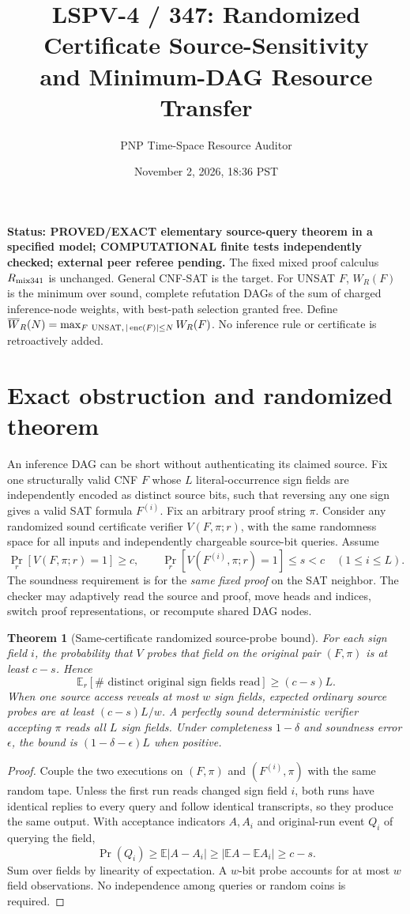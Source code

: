 \documentclass[11pt]{article}
\title{LSPV-4 / 347: Randomized Certificate Source-Sensitivity\\and Minimum-DAG Resource Transfer}
\author{PNP Time-Space Resource Auditor}
\date{November 2, 2026, 18:36 PST}
\newtheorem{theorem}{Theorem}
\begin{document}
\maketitle
\noindent\textbf{Status: PROVED/EXACT elementary source-query theorem in a specified model; COMPUTATIONAL finite tests independently checked; external peer referee pending.}
The fixed mixed proof calculus $R_{\rm mix341}$ is unchanged. General CNF-SAT is the target. For UNSAT $F$, $W_R(F)$ is the minimum over sound, complete refutation DAGs of the sum of charged inference-node weights, with best-path selection granted free. Define $\overline W_R(N)=\max_{F\ {\rm UNSAT},\,|\operatorname{enc}(F)|\le N}W_R(F)$. No inference rule or certificate is retroactively added.

\section*{Exact obstruction and randomized theorem}
An inference DAG can be short without authenticating its claimed source. Fix one structurally valid CNF $F$ whose $L$ literal-occurrence sign fields are independently encoded as distinct source bits, such that reversing any one sign gives a valid SAT formula $F^{(i)}$. Fix an arbitrary proof string $\pi$. Consider any randomized sound certificate verifier $V(F,\pi;r)$, with the same randomness space for all inputs and independently chargeable source-bit queries. Assume
\[
\Pr_r[V(F,\pi;r)=1]\ge c,\qquad
\Pr_r[V(F^{(i)},\pi;r)=1]\le s<c
\quad (1\le i\le L).
\]
The soundness requirement is for the \emph{same fixed proof} on the SAT neighbor. The checker may adaptively read the source and proof, move heads and indices, switch proof representations, or recompute shared DAG nodes.

\begin{theorem}[Same-certificate randomized source-probe bound]
For each sign field $i$, the probability that $V$ probes that field on the original pair $(F,\pi)$ is at least $c-s$. Hence
\[
\boxed{\mathbb E_r[\#\text{ distinct original sign fields read}]\ge(c-s)L.}
\]
When one source access reveals at most $w$ sign fields, expected ordinary source probes are at least $(c-s)L/w$. A perfectly sound deterministic verifier accepting $\pi$ reads all $L$ sign fields. Under completeness $1-\delta$ and soundness error $\epsilon$, the bound is $(1-\delta-\epsilon)L$ when positive.
\end{theorem}
\begin{proof}
Couple the two executions on $(F,\pi)$ and $(F^{(i)},\pi)$ with the same random tape. Unless the first run reads changed sign field $i$, both runs have identical replies to every query and follow identical transcripts, so they produce the same output. With acceptance indicators $A,A_i$ and original-run event $Q_i$ of querying the field,
\[
\Pr(Q_i)\ge\mathbb E|A-A_i|\ge|\mathbb EA-\mathbb EA_i|\ge c-s.
\]
Sum over fields by linearity of expectation. A $w$-bit probe accounts for at most $w$ field observations. No independence among queries or random coins is required.
\end{proof}
\end{document}
